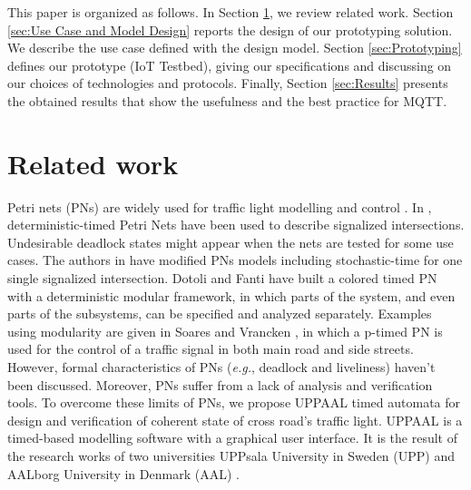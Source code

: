 This paper is organized as follows. In Section \ref{Sec:Related_Works}, we review related work. 
Section \ref{sec:Use Case and Model Design} reports the design of our prototyping solution. We describe the use case defined with the design model.
Section \ref{sec:Prototyping} defines our prototype (IoT Testbed), giving our specifications and discussing on our choices of technologies and protocols. Finally, Section \ref{sec:Results} presents the obtained results that show the usefulness and the best practice for MQTT.

\section{Related work}
\label{Sec:Related_Works}

Petri nets (PNs) are widely used for traffic light modelling and control \cite{huang_modular_2014}.
In  \cite{difebbraro_trafficresponsive_2006}, deterministic-timed Petri Nets have been used to describe signalized intersections. Undesirable deadlock states might appear when the nets are tested for some use cases. The authors in \cite{febbraro_using_2009} have modified PNs models including  stochastic-time for one single signalized intersection. Dotoli and Fanti \cite{dotoli_urban_2004} have built a colored timed PN with a deterministic modular framework, in which parts of the system, and even parts of the subsystems, can be specified and analyzed separately.
Examples using modularity are given in Soares and Vrancken \cite{dossantossoares_modular_2012}, in which a p-timed PN is used for the control of a traffic signal in both main road and side streets. However, formal characteristics of PNs (\emph{e.g.}, deadlock and liveliness) haven’t been discussed. Moreover, PNs suffer from a lack of analysis and verification tools. To overcome these limits of PNs, we propose UPPAAL timed automata for design and verification of coherent state of cross road's traffic light. UPPAAL is a timed-based modelling software with a graphical user interface. It is the result of the research works of two universities UPPsala University in Sweden (UPP) and AALborg University in Denmark (AAL) \cite{david_uppaal_2015}.



